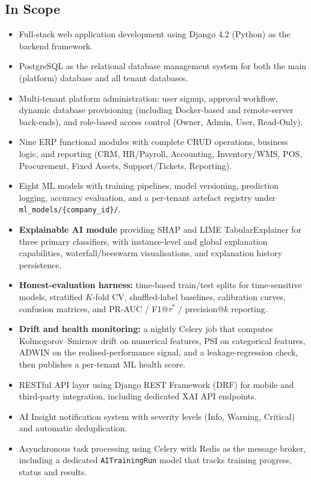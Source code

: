 \documentclass[12pt,a4paper]{report}
\begin{document}
\subsection{In Scope}
\begin{itemize}
  \item Full-stack web application development using Django 4.2 (Python) as the backend framework.
  \item PostgreSQL as the relational database management system for both the main (platform) database and all tenant databases.
  \item Multi-tenant platform administration: user signup, approval workflow, dynamic database provisioning (including Docker-based and remote-server back-ends), and role-based access control (Owner, Admin, User, Read-Only).
  \item Nine ERP functional modules with complete CRUD operations, business logic, and reporting (CRM, HR/Payroll, Accounting, Inventory/WMS, POS, Procurement, Fixed Assets, Support/Tickets, Reporting).
  \item Eight ML models with training pipelines, model versioning, prediction logging, accuracy evaluation, and a per-tenant artefact registry under \texttt{ml\_models/\{company\_id\}/}.
  \item \textbf{Explainable AI module} providing SHAP and LIME TabularExplainer for three primary classifiers, with instance-level and global explanation capabilities, waterfall/beeswarm visualisations, and explanation history persistence.
  \item \textbf{Honest-evaluation harness:} time-based train/test splits for time-sensitive models, stratified $K$-fold CV, shuffled-label baselines, calibration curves, confusion matrices, and PR-AUC / F1@$\tau^{*}$ / precision@$k$ reporting.
  \item \textbf{Drift and health monitoring:} a nightly Celery job that computes Kolmogorov--Smirnov drift on numerical features, PSI on categorical features, ADWIN on the realised-performance signal, and a leakage-regression check, then publishes a per-tenant ML health score.
  \item RESTful API layer using Django REST Framework (DRF) for mobile and third-party integration, including dedicated XAI API endpoints.
  \item AI Insight notification system with severity levels (Info, Warning, Critical) and automatic deduplication.
  \item Asynchronous task processing using Celery with Redis as the message broker, including a dedicated \texttt{AITrainingRun} model that tracks training progress, status and results.

\end{itemize}
\end{document}
